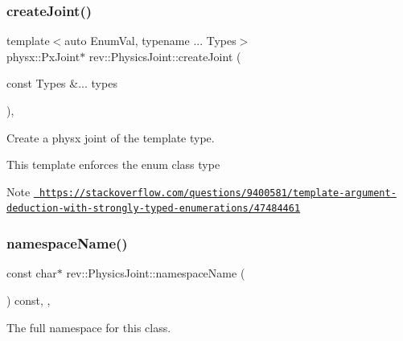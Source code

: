 \mbox{\label{classrev_1_1_physics_joint_a2af8aa1362fb5b278518b5502d37145b}} 
\subsubsection{\texorpdfstring{createJoint()}{createJoint()}}
{\footnotesize\ttfamily template$<$auto Enum\+Val, typename ... Types$>$ \\
physx\+::\+Px\+Joint$\ast$ rev\+::\+Physics\+Joint\+::create\+Joint (\begin{DoxyParamCaption}\item[{const Types \&...}]{types }\end{DoxyParamCaption})\hspace{0.3cm}{\ttfamily [inline]}, {\ttfamily [protected]}}



Create a physx joint of the template type. 

This template enforces the enum class type \begin{DoxyNote}{Note}
\href{https://stackoverflow.com/questions/9400581/template-argument-deduction-with-strongly-typed-enumerations/47484461}{\texttt{ https\+://stackoverflow.\+com/questions/9400581/template-\/argument-\/deduction-\/with-\/strongly-\/typed-\/enumerations/47484461}} 
\end{DoxyNote}
\mbox{\label{classrev_1_1_physics_joint_a312be29fc0f85bacb01952c63e985096}} 
\subsubsection{\texorpdfstring{namespaceName()}{namespaceName()}}
{\footnotesize\ttfamily const char$\ast$ rev\+::\+Physics\+Joint\+::namespace\+Name (\begin{DoxyParamCaption}{ }\end{DoxyParamCaption}) const\hspace{0.3cm}{\ttfamily [inline]}, {\ttfamily [override]}, {\ttfamily [virtual]}}



The full namespace for this class. 


